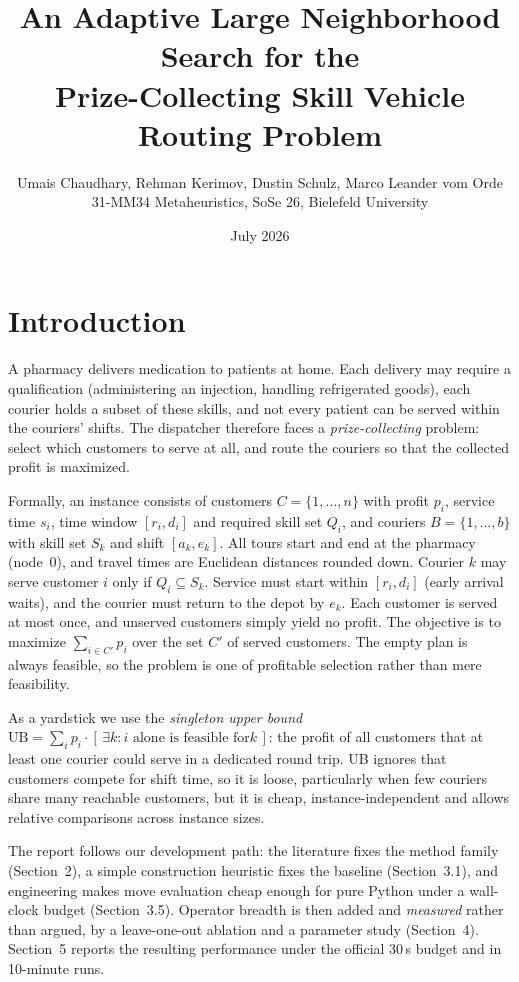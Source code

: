 \documentclass[10pt, a4paper]{article}
\title{An Adaptive Large Neighborhood Search for the\\
       Prize-Collecting Skill Vehicle Routing Problem}
\author{Umais Chaudhary, Rehman Kerimov, Dustin Schulz, Marco Leander vom Orde \\
        \small 31-MM34 Metaheuristics, SoSe 26, Bielefeld University}
\date{July 2026}
\begin{document}
\maketitle

\section{Introduction}

A pharmacy delivers medication to patients at home. Each delivery may require
a qualification (administering an injection, handling refrigerated goods),
each courier holds a subset of these skills, and not every patient can be
served within the couriers' shifts. The dispatcher therefore faces a
\emph{prize-collecting} problem: select which customers to serve at all, and
route the couriers so that the collected profit is maximized.

Formally, an instance consists of customers $C=\{1,\dots,n\}$ with profit
$p_i$, service time $s_i$, time window $[r_i, d_i]$ and required skill set
$Q_i$, and couriers $B=\{1,\dots,b\}$ with skill set $S_k$ and shift
$[a_k, e_k]$. All tours start and end at the pharmacy (node~0), and travel times
are Euclidean distances rounded down. Courier $k$ may serve customer $i$ only
if $Q_i \subseteq S_k$. Service must start within $[r_i,d_i]$ (early arrival
waits), and the courier must return to the depot by $e_k$. Each customer is
served at most once, and unserved customers simply yield no profit. The objective
is to maximize $\sum_{i \in C'} p_i$ over the set $C'$ of served customers.
The empty plan is always feasible, so the problem is one of profitable
selection rather than mere feasibility.

As a yardstick we use the \emph{singleton upper bound}
$\mathrm{UB} = \sum_i p_i \cdot [\,\exists k: \text{$i$ alone is feasible for
$k$}\,]$: the profit of all customers that at least one courier could serve
in a dedicated round trip. UB ignores that customers compete for shift time,
so it is loose, particularly when few couriers share many reachable
customers, but it is cheap, instance-independent and allows relative
comparisons across instance sizes.

The report follows our development path: the literature fixes the method
family (Section~2), a simple construction heuristic fixes the baseline
(Section~3.1), and engineering makes move evaluation cheap enough for pure
Python under a wall-clock budget (Section~3.5). Operator breadth is then
added and
\emph{measured} rather than argued, by a leave-one-out ablation and a
parameter study (Section~4). Section~5 reports the resulting performance
under the official 30\,s budget and in 10-minute runs.
\end{document}
